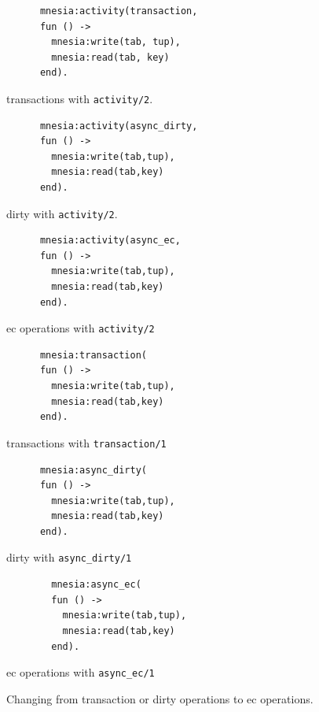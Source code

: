 \begin{listing}[htp]
  \begin{sublisting}[t]{0.48\columnwidth}
    \begin{verbatim}
      mnesia:activity(transaction, 
      fun () -> 
        mnesia:write(tab, tup),
        mnesia:read(tab, key)
      end).
    \end{verbatim}
    \caption{transactions with \texttt{activity/2}.}
  \end{sublisting}
  \begin{sublisting}[t]{0.48\columnwidth}
    \begin{verbatim}
      mnesia:activity(async_dirty, 
      fun () -> 
        mnesia:write(tab,tup),
        mnesia:read(tab,key)
      end).
    \end{verbatim}
    \caption{dirty with \texttt{activity/2}.}
  \end{sublisting}
  
  \begin{sublisting}[t]{\columnwidth}
    \begin{verbatim}
      mnesia:activity(async_ec, 
      fun () -> 
        mnesia:write(tab,tup),
        mnesia:read(tab,key)
      end).
    \end{verbatim}
    \caption{\acrshort{ec} operations with \texttt{activity/2}}
  \end{sublisting}
  \begin{sublisting}[t]{0.48\columnwidth}
    \begin{verbatim}
      mnesia:transaction(
      fun () -> 
        mnesia:write(tab,tup),
        mnesia:read(tab,key)
      end).
    \end{verbatim}
    \caption{transactions with \texttt{transaction/1}}
  \end{sublisting}
  \begin{sublisting}[t]{0.48\columnwidth}
    \begin{verbatim}
      mnesia:async_dirty(
      fun () -> 
        mnesia:write(tab,tup),
        mnesia:read(tab,key)
      end).
    \end{verbatim}
  \caption{dirty with \texttt{async\_dirty/1}}
  \end{sublisting}
  
  \begin{sublisting}[t]{\columnwidth}
      \begin{verbatim}
        mnesia:async_ec(
        fun () -> 
          mnesia:write(tab,tup),
          mnesia:read(tab,key)
        end).
      \end{verbatim}
    \caption{\acrshort{ec} operations with \texttt{async\_ec/1}}
  \end{sublisting}
  \caption{Changing from transaction or dirty operations to \acrshort{ec} operations.}
  \label{lst:ec api comparison}
\end{listing}


